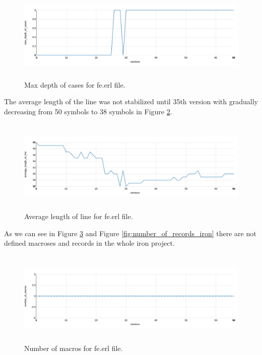\begin{figure}[h]
	\centering
	\includegraphics[height=45mm]{figures/max_depth_of_cases_iron.png}
	\caption{Max depth of cases for fe.erl file.}
	\label{fig:max_depth_of_cases_iron}
\end{figure}

The average length of the line was not stabilized until 35th version with gradually decreasing from 50 symbols to 38 symbols in Figure \ref{fig:average_length_of_line_iron}.

\begin{figure}[h]
	\centering
	\includegraphics[height=45mm]{figures/average_length_of_line_iron.png}
	\caption{Average length of line for fe.erl file.}
	\label{fig:average_length_of_line_iron}
\end{figure}

As we can see in Figure \ref{fig:number_of_macros_iron} and Figure \ref{fig:number_of_records_iron} there are not defined macroses and records in the whole iron project.

\begin{figure}[h]
	\centering
	\includegraphics[height=45mm]{figures/number_of_macros_iron.png}
	\caption{Number of macros for fe.erl file.}
	\label{fig:number_of_macros_iron}
\end{figure}

